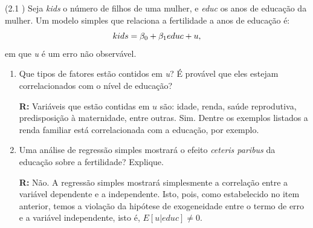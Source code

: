 \documentclass[12pt,letterpaper, onecolumn]{exam}
\renewenvironment{solution}
  {\par\noindent\textbf{R:}\enspace\color{blue}}
  {\par\color{black}}
\begin{document}
\begin{questions}
    \question (2.1 \citep{wooldridge2016}) Seja \textit{kids} o número de filhos de uma mulher, e \textit{educ} os anos de educação da mulher. Um modelo simples que relaciona a fertilidade a anos de educação é:\begin{equation*}
        kids = \beta_0 + \beta_1educ + u \\ \text{,}
    \end{equation*} em que \textit{u} é um erro não observável.
    \begin{enumerate} [label = (\alph*)]
        \item Que tipos de fatores estão contidos em \textit{u}? É provável que eles estejam correlacionados com o nível de educação?
        \begin{solution}
            Variáveis que estão contidas em $u$ são: idade, renda, saúde reprodutiva, predisposição à maternidade, entre outras.
            Sim. Dentre os exemplos listados a renda familiar está correlacionada com a educação, por exemplo.
        \end{solution}
        \item Uma análise de regressão simples mostrará o efeito \textit{ceteris paribus} da educação sobre a fertilidade? Explique.
        \begin{solution}
            Não. A regressão simples mostrará simplesmente a correlação entre a variável dependente e a independente. Isto, pois, como estabelecido no item anterior, temos a violação da hipótese de exogeneidade entre o termo de erro e a variável independente, isto é, $E[u|educ] \neq 0$.
        \end{solution}
    \end{enumerate}



\end{questions}
\end{document}
